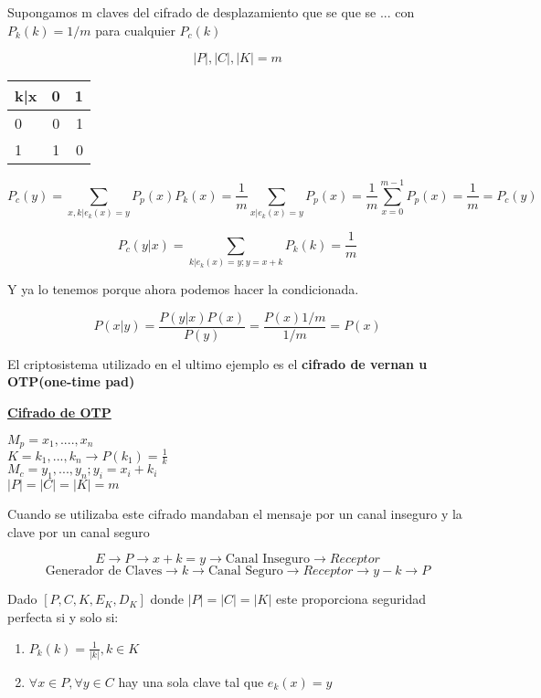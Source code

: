 \begin{example}
 	

Supongamos m claves del cifrado de desplazamiento que se que se ... con $P_k(k) = 1/m$ para cualquier $P_c(k)$

$$|P| , |C| , |K| = m$$

	\begin{center}
		
	\begin{tabular}{l | c | r}
		k|x & 0 & 1\\
		\hline
		0 & 0 & 1 \\
		\hline
		1 & 1 & 0\\
	
	\end{tabular}
\end{center}
	
	$$P_c(y) = \sum_{x,k | e_k(x) = y} P_p(x) P_k(x) = \frac{1}{m} \sum_{x|e_k(x) = y} P_p(x) = \frac{1}{m} \sum_{x=0}^{m-1} P_p(x) = \frac{1}{m} = P_c(y)$$


	$$P_c(y|x) = \sum_{k|e_k(x) = y; y= x+k} P_k(k) = \frac{1}{m}$$
	
	Y ya lo tenemos porque ahora podemos hacer la condicionada.
	
	$$P(x|y) = \frac{P(y|x) P (x)}{P(y)} = \frac{P(x) 1/m}{1/m} = P(x)$$
 \end{example}
 
 El criptosistema utilizado en el ultimo ejemplo es el \textbf{cifrado de vernan u OTP(one-time pad)}
 
 
 
 \underline{\textbf{Cifrado de OTP}}
 \begin{center}

 $M_p = x_1,....,x_n$\\
 $K= k_1,...,k_n \rightarrow P(k_1) = \frac{1}{k}$\\
 $M_c = y_1,...,y_n ; y_i = x_i + k_i$\\
 $|P| = |C| = |K| = m$
  	
  \end{center}
 
 Cuando se utilizaba este cifrado mandaban el mensaje por un canal inseguro y la clave por un canal seguro
 
 $$E \rightarrow P \rightarrow x+k = y \rightarrow \text{Canal Inseguro} \rightarrow Receptor$$
 $$\text{Generador de Claves} \rightarrow k \rightarrow \text{Canal Seguro} \rightarrow Receptor \rightarrow y-k \rightarrow P$$
 
 \begin{theorem}
 	Dado $[P,C,K,E_K,D_K]$ donde $|P| = |C| = |K|$ este proporciona seguridad perfecta si y solo si:
 	\begin{enumerate}
 		\item $P_k (k) = \frac{1}{|k|} ,  k\in K$
 		\item $\forall x \in P , \forall y \in C$ hay una sola clave tal que $e_k(x) = y$
 	\end{enumerate}
 \end{theorem}
 
